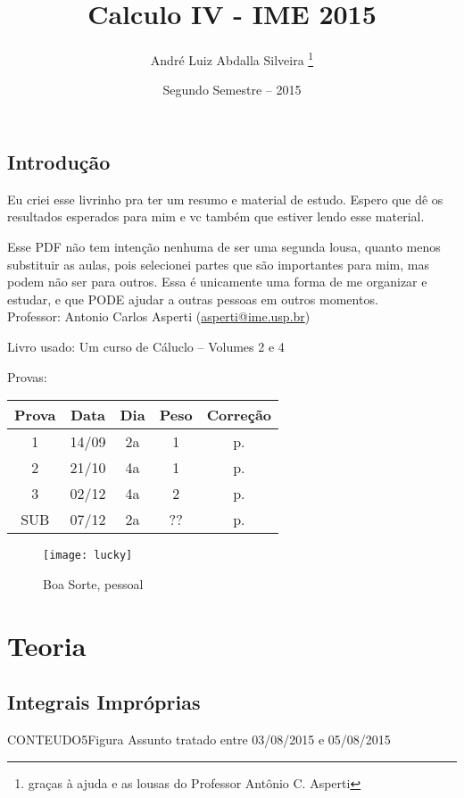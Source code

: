 \documentclass[12pt,openany, letterpaper]{book}
\title{Calculo IV - IME 2015}
\author{André Luiz Abdalla Silveira \thanks{graças à ajuda e as lousas do Professor Antônio C. Asperti}}
\date{Segundo Semestre -- 2015}
\begin{document}
\maketitle

\tableofcontents


\chapter*{Introdução}
\label{chap:c0}

\hspace{5mm} Eu criei esse livrinho pra ter um resumo e material de estudo. Espero que dê os resultados esperados para mim e vc também que estiver lendo esse material. 

Esse PDF não tem intenção nenhuma de ser uma segunda lousa, quanto menos substituir as aulas, pois selecionei partes que são importantes para mim, mas podem não ser para outros. Essa é unicamente uma forma de me organizar e estudar, e que PODE ajudar a outras pessoas em outros momentos.\\

Professor: 	Antonio Carlos Asperti (\href{mailto:asperti@ime.usp.br}{asperti@ime.usp.br})

Livro usado: Um curso de Cáluclo -- Volumes 2 e 4
\vspace{10mm}

Provas:
\begin{tabular}{|c|c|c|c|c|}
\hline
 Prova & Data & Dia & Peso & Correção \\ \hline 
 1 & 14/09 & 2a & 1 &  p. \pageref{C:P1}\\ \hline
 2 & 21/10 & 4a & 1 &  p. \pageref{C:P2}\\ \hline
 3 & 02/12 & 4a & 2 &  p. \pageref{C:P3}\\ \hline
 SUB & 07/12 & 2a & ?? & p. \pageref{C:SUB} \\\hline
\end{tabular}

\begin{figure}
\centering
\texttt{[image: lucky]}
\caption{Boa Sorte, pessoal}
\label{fig:lucky}
\end{figure}


\part{Teoria}
\chapter{Integrais Impróprias}
\label{chap:c1}
CONTEUDO5Figura
\hspace{5mm} Assunto tratado entre 03/08/2015 e 05/08/2015
\end{document}
